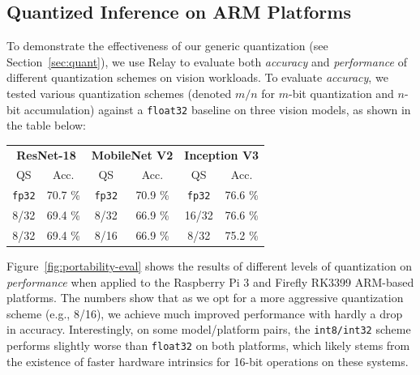   \subsection{Quantized Inference on ARM Platforms}
  To demonstrate the effectiveness of our generic quantization (see Section~\ref{sec:quant}),
    we use Relay to evaluate both \textit{accuracy} and \textit{performance} of different
    quantization schemes on vision workloads.
  To evaluate \textit{accuracy},
    we tested various quantization schemes
    (denoted $m/n$ for $m$-bit quantization and $n$-bit accumulation)
    against a \texttt{float32} baseline on three vision models,
    as shown in the table below:
  \begin{center}
    \begin{tabular}{|c|c||c|c||c|c|}
      \hline
      \multicolumn{2}{|c}{\textbf{ResNet-18}} & \multicolumn{2}{c}{\textbf{MobileNet V2}} & \multicolumn{2}{c|}{\textbf{Inception V3}} \\
      \multicolumn{1}{|c}{QS}    & \multicolumn{1}{c}{Acc.}   &  \multicolumn{1}{c}{QS}  & \multicolumn{1}{c}{Acc.}  & \multicolumn{1}{c}{QS}  & \multicolumn{1}{c|}{Acc.} \\
      \hline
      \texttt{fp32} & 70.7 \%    & \texttt{fp32} & 70.9 \%       & \texttt{fp32} & 76.6 \% \\
      8/32         & 69.4 \%    & 8/32         & 66.9 \%       & 16/32        & 76.6 \% \\
      8/32         & 69.4 \%    & 8/16         & 66.9 \%       & 8/32         & 75.2 \% \\
      \hline
    \end{tabular}
  \end{center}
  Figure~\ref{fig:portability-eval} shows the results of different
    levels of quantization on \textit{performance} when applied to the Raspberry Pi 3
    and Firefly RK3399 ARM-based platforms.
  The numbers show that as we opt for a more aggressive quantization scheme
    (e.g., 8/16),
    we achieve much improved performance with hardly a drop in accuracy.
  Interestingly,
    on some model/platform pairs,
    the \texttt{int8/int32} scheme performs slightly worse than \texttt{float32} on both platforms,
    which likely stems from the existence of faster hardware intrinsics for 16-bit operations on these systems.

